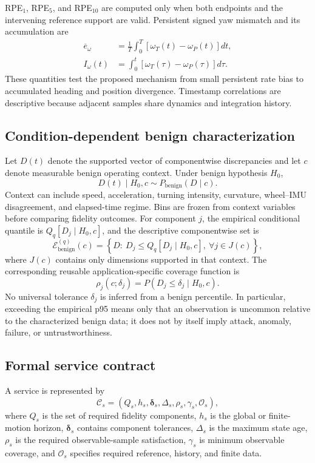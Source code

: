 \documentclass[journal,onecolumn]{IEEEtran}
\begin{document}
RPE$_1$, RPE$_5$, and RPE$_{10}$ are computed only when both endpoints and the intervening reference support are valid. Persistent signed yaw mismatch and its accumulation are
\begin{align}
\overline e_\omega&=\frac{1}{T}\int_0^T[\omega_T(t)-\omega_P(t)]dt,\\
I_\omega(t)&=\int_0^t[\omega_T(\tau)-\omega_P(\tau)]d\tau.
\end{align}
These quantities test the proposed mechanism from small persistent rate bias to accumulated heading and position divergence. Timestamp correlations are descriptive because adjacent samples share dynamics and integration history.

\subsection{Condition-dependent benign characterization}
Let $D(t)$ denote the supported vector of componentwise discrepancies and let $c$ denote measurable benign operating context. Under benign hypothesis $H_0$,
\begin{equation}
D(t)\mid H_0,c \sim P_{\mathrm{benign}}(D\mid c).
\end{equation}
Context can include speed, acceleration, turning intensity, curvature, wheel--IMU disagreement, and elapsed-time regime. Bins are frozen from context variables before comparing fidelity outcomes. For component $j$, the empirical conditional quantile is $Q_q[D_j\mid H_0,c]$, and the descriptive componentwise set is
\begin{equation}
\mathcal{E}_{\mathrm{benign}}^{(q)}(c)=
\left\{D:\ D_j\le Q_q[D_j\mid H_0,c],\ \forall j\in J(c)\right\},
\end{equation}
where $J(c)$ contains only dimensions supported in that context. The corresponding reusable application-specific coverage function is
\begin{equation}
\rho_j(c;\delta_j)=
P\!\left(D_j\le\delta_j\mid H_0,c\right).
\end{equation}
No universal tolerance $\delta_j$ is inferred from a benign percentile. In particular, exceeding the empirical p95 means only that an observation is uncommon relative to the characterized benign data; it does not by itself imply attack, anomaly, failure, or untrustworthiness.

\subsection{Formal service contract}
A service is represented by
\begin{equation}
\mathcal{C}_s=
\left(Q_s,h_s,\boldsymbol{\delta}_s,\Delta_s,
\rho_s,\gamma_s,\mathcal{O}_s\right),
\end{equation}
where $Q_s$ is the set of required fidelity components, $h_s$ is the global or finite-motion horizon, $\boldsymbol{\delta}_s$ contains component tolerances, $\Delta_s$ is the maximum state age, $\rho_s$ is the required observable-sample satisfaction, $\gamma_s$ is minimum observable coverage, and $\mathcal{O}_s$ specifies required reference, history, and finite data.
\end{document}
